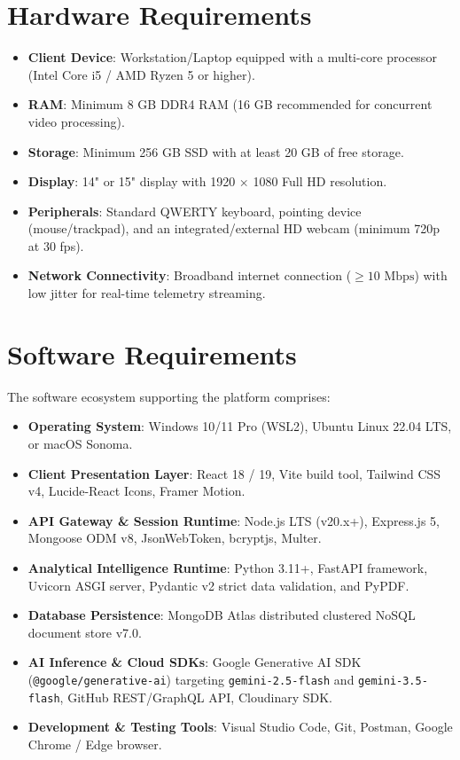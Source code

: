 \section{Hardware Requirements}
\begin{itemize}
    \item \textbf{Client Device}: Workstation/Laptop equipped with a multi-core processor (Intel Core i5 / AMD Ryzen 5 or higher).
    \item \textbf{RAM}: Minimum 8 GB DDR4 RAM (16 GB recommended for concurrent video processing).
    \item \textbf{Storage}: Minimum 256 GB SSD with at least 20 GB of free storage.
    \item \textbf{Display}: 14" or 15" display with 1920 $\times$ 1080 Full HD resolution.
    \item \textbf{Peripherals}: Standard QWERTY keyboard, pointing device (mouse/trackpad), and an integrated/external HD webcam (minimum 720p at 30 fps).
    \item \textbf{Network Connectivity}: Broadband internet connection ($\ge 10\text{ Mbps}$) with low jitter for real-time telemetry streaming.
\end{itemize}

\section{Software Requirements}
The software ecosystem supporting the platform comprises:
\begin{itemize}
    \item \textbf{Operating System}: Windows 10/11 Pro (WSL2), Ubuntu Linux 22.04 LTS, or macOS Sonoma.
    \item \textbf{Client Presentation Layer}: React 18 / 19, Vite build tool, Tailwind CSS v4, Lucide-React Icons, Framer Motion.
    \item \textbf{API Gateway \& Session Runtime}: Node.js LTS (v20.x+), Express.js 5, Mongoose ODM v8, JsonWebToken, bcryptjs, Multer.
    \item \textbf{Analytical Intelligence Runtime}: Python 3.11+, FastAPI framework, Uvicorn ASGI server, Pydantic v2 strict data validation, and PyPDF.
    \item \textbf{Database Persistence}: MongoDB Atlas distributed clustered NoSQL document store v7.0.
    \item \textbf{AI Inference \& Cloud SDKs}: Google Generative AI SDK (\texttt{@google/generative-ai}) targeting \texttt{gemini-2.5-flash} and \texttt{gemini-3.5-flash}, GitHub REST/GraphQL API, Cloudinary SDK.
    \item \textbf{Development \& Testing Tools}: Visual Studio Code, Git, Postman, Google Chrome / Edge browser.
\end{itemize}

